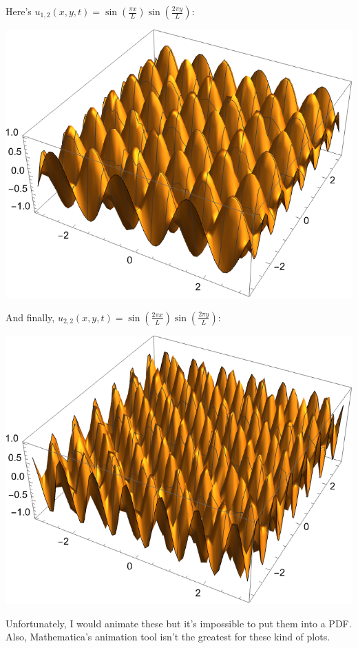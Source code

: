 \documentclass{article}
\begin{document}
\begin{solution}
\begin{center}
	\end{center}
	Here's $u_{1, 2}(x, y, t) = \sin(\frac{\pi x}{L}) \sin(\frac{2 \pi y}{L})$:
	\begin{center}
		\includegraphics[scale=0.7]{u12.png}
	\end{center}
	And finally, $u_{2, 2}(x, y, t) = \sin(\frac{2 \pi x}{L}) \sin(\frac{2 \pi y}{L})$:
	\begin{center}
		\includegraphics[scale=0.7]{u22.png}
	\end{center}
	Unfortunately, I would animate these but it's impossible to put them into a PDF. Also, Mathematica's
	animation tool isn't the greatest for these kind of plots. 
\end{solution}
\end{document}
